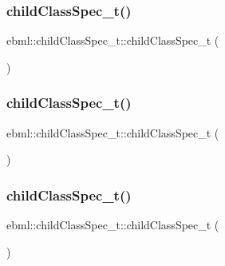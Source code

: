 \subsubsection{\texorpdfstring{child\+Class\+Spec\+\_\+t()}{childClassSpec\_t()}\hspace{0.1cm}{\footnotesize\ttfamily [1/4]}}
{\footnotesize\ttfamily ebml\+::child\+Class\+Spec\+\_\+t\+::child\+Class\+Spec\+\_\+t (\begin{DoxyParamCaption}{ }\end{DoxyParamCaption})}

\mbox{\label{classebml_1_1childClassSpec__t_a97b0d1507fb1b33ec036e4e487380a22}} 
\subsubsection{\texorpdfstring{child\+Class\+Spec\+\_\+t()}{childClassSpec\_t()}\hspace{0.1cm}{\footnotesize\ttfamily [2/4]}}
{\footnotesize\ttfamily ebml\+::child\+Class\+Spec\+\_\+t\+::child\+Class\+Spec\+\_\+t (\begin{DoxyParamCaption}\item[{const \mbox{\hyperlink{namespaceebml_a40cf7ad4b58caaa8c07da3ed83f7a431}{child\+Class\+Spec\+Arg\+\_\+init\+\_\+l}} \&}]{ }\end{DoxyParamCaption})}

\mbox{\label{classebml_1_1childClassSpec__t_a1614563adfde1b6bf6d4a10ce978d892}} 
\subsubsection{\texorpdfstring{child\+Class\+Spec\+\_\+t()}{childClassSpec\_t()}\hspace{0.1cm}{\footnotesize\ttfamily [3/4]}}
{\footnotesize\ttfamily ebml\+::child\+Class\+Spec\+\_\+t\+::child\+Class\+Spec\+\_\+t (\begin{DoxyParamCaption}\item[{const \mbox{\hyperlink{namespaceebml_abf07998998c284c9be3f76b5d9e192e1}{child\+Class\+Spec\+Arg\+\_\+l}} \&}]{ }\end{DoxyParamCaption})}

